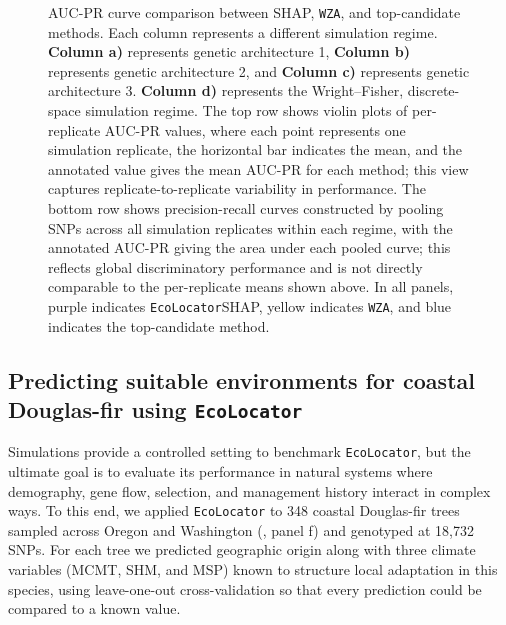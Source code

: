 \documentclass[]{article}
\newcommand{\dfir}{Douglas-fir\xspace}
\newcommand{\ecolocator}{\texttt{EcoLocator}\xspace}
\begin{document}
\begin{figure}[H]
    \caption{AUC-PR curve comparison between SHAP, \texttt{WZA}, and top-candidate methods.
    Each column represents a different simulation regime. \textbf{Column a)} represents
    genetic architecture 1, \textbf{Column b)} represents genetic architecture 2,
    and \textbf{Column c)} represents genetic architecture 3. \textbf{Column d)}
    represents the Wright--Fisher, discrete-space simulation regime. The top row
    shows violin plots of per-replicate AUC-PR values, where each point represents
    one simulation replicate, the horizontal bar indicates the mean, and the
    annotated value gives the mean AUC-PR for each method; this view captures
    replicate-to-replicate variability in performance. The bottom row shows
    precision-recall curves constructed by pooling SNPs across all simulation
    replicates within each regime, with the annotated AUC-PR giving the area
    under each pooled curve; this reflects global discriminatory performance
    and is not directly comparable to the per-replicate means shown above. In all panels,
    purple indicates \ecolocator\texttimes{}SHAP, yellow indicates \texttt{WZA},
    and blue indicates the top-candidate method.}
    \label{fig:gea-comparison}
\end{figure}


\subsection{Predicting suitable environments
for coastal \dfir using \ecolocator}

Simulations provide a controlled setting to benchmark \ecolocator,
but the ultimate goal is to evaluate its performance in natural systems
where demography, gene flow, selection, and management history
interact in complex ways. To this end,
we applied \ecolocator to 348 coastal \dfir trees
sampled across Oregon and Washington (, panel f)
and genotyped at 18,732 SNPs.
For each tree we predicted geographic origin along with three climate
variables (MCMT, SHM, and MSP) known to structure local adaptation in this species,
using leave-one-out cross-validation so that every prediction
could be compared to a known value.
\end{document}
